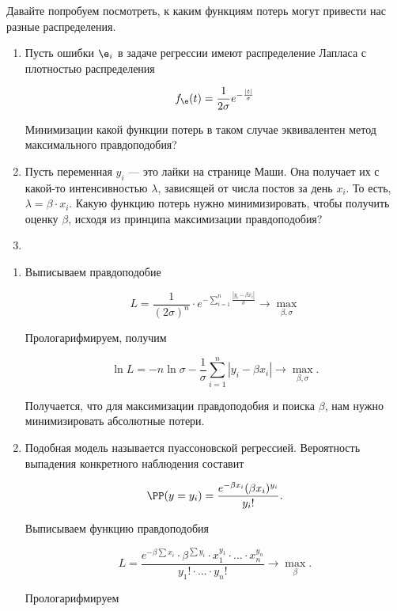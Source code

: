 \begin{problem}\label{log_reg}
	Давайте попробуем посмотреть, к каким функциям потерь могут привести нас разные распределения. 
	\begin{enumerate}
		\item Пусть ошибки $\e_i$ в задаче регрессии имеют распределение Лапласа с плотностью распределения 
		
		\[f_{\e}(t) = \frac{1}{2 \sigma} e^{-\frac{|t|}{\sigma}} \] 
		
		Минимизации какой функции потерь в таком случае эквивалентен метод максимального правдоподобия? 
		
		\item Пусть переменная $y_i$ --- это лайки на странице Маши. Она получает их с какой-то интенсивностью $\lambda$, зависящей от числа постов за день $x_i$. То есть, $\lambda = \beta \cdot x_i$. Какую функцию потерь нужно минимизировать, чтобы получить оценку $\beta$, исходя из принципа максимизации правдоподобия? 
		
		\item {}

	\end{enumerate}
	\begin{sol}
	\begin{enumerate}		
		\item Выписываем правдоподобие
		
		\[ L = \frac{1}{(2 \sigma)^n} \cdot e^{- \sum_{i=1}^n \frac{|y_i - \beta x_i|}{\sigma}} \to \max_{\beta, \sigma} \] 
		
		Прологарифмируем, получим 
		
		\[ \ln L = - n \ln \sigma - \frac{1}{\sigma} \sum_{i=1}^n |y_i - \beta x_i| \to \max_{\beta, \sigma}.\]
		
		Получается, что для максимизации правдоподобия и поиска $\beta$, нам нужно минимизировать абсолютные потери. 
		
		\item  Подобная модель называется пуассоновской регрессией.  Вероятность выпадения конкретного наблюдения составит 
		
		\[ \PP(y = y_i) = \frac{e^{-\beta x_i} (\beta x_i)^{y_i}}{y_i!}.\]
		
		Выписываем функцию правдоподобия 
		
		\[ L = \frac{e^{-\beta \sum x_i} \cdot \beta^{\sum y_i} \cdot x_1^{y_1} \cdot \ldots \cdot x_n^{y_n}}{y_1! \cdot \ldots \cdot y_n!} \to \max_{\beta}. \]
		
		Прологарифмируем
		

\end{enumerate}
\end{sol}
\end{problem}
